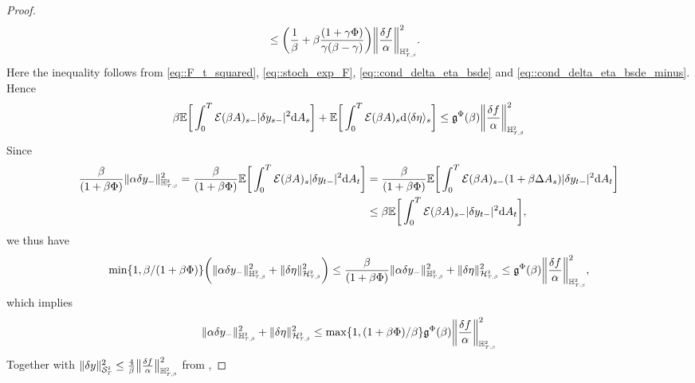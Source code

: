 \documentclass[10pt]{article} %
\newcommand\cE{\mathcal E}
\newcommand\cH{\mathcal H}
\newcommand\cS{\mathcal S}
\newcommand{\smalltext}[1]{\text{\fontsize{4}{4}\selectfont$#1$}}
\newcommand\fg{\mathfrak g}
\def \E{\mathbb{E}}
\def \H{\mathbb{H}}
\newcommand{\1}{\mathbf{1}}
\def\d{\mathrm{d}}
\begin{document}
\begin{proof}
\begin{align*}
		&\leq \bigg(\frac{1}{\beta} + \beta\frac{(1+\gamma\Phi)}{\gamma(\beta-\gamma)}\bigg) \bigg\|\frac{\delta f}{\alpha}\bigg\|^2_{\H^\smalltext{2}_{\smalltext{T}\smalltext{,}\smalltext{\beta}}}.
	\end{align*}
	Here the inequality follows from \eqref{eq::F_t_squared}, \eqref{eq::stoch_exp_F}, \eqref{eq::cond_delta_eta_bsde} and \eqref{eq::cond_delta_eta_bsde_minus}. Hence
	\begin{equation*}
		\beta \E\bigg[\int_0^T \cE(\beta A)_{s-}|\delta y_{s-}|^2\d A_s\bigg] + \E\bigg[\int_0^T \cE(\beta A)_s \d \langle\delta\eta\rangle_s\bigg] \leq \fg^\Phi(\beta) \bigg\|\frac{\delta f}{\alpha}\bigg\|^2_{\H^\smalltext{2}_{\smalltext{T}\smalltext{,}\smalltext{\beta}}}
	\end{equation*}
	 Since
	\begin{align*}
		\frac{\beta}{(1+\beta\Phi)}\|\alpha\delta y_{-}\|^2_{\H^\smalltext{2}_{\smalltext{T}\smalltext{,}\smalltext{\beta}}} = \frac{\beta}{(1+\beta\Phi)} \E\bigg[\int_0^T \cE(\beta A)_{s}|\delta y_{t-}|^2\d A_t\bigg] 
		&= \frac{\beta}{(1+\beta\Phi)} \E\bigg[\int_0^T \cE(\beta A)_{s-}(1+\beta\Delta A_s)|\delta y_{t-}|^2\d A_t\bigg] \\
		&\leq \beta \E\bigg[\int_0^T \cE(\beta A)_{s-}|\delta y_{t-}|^2\d A_t\bigg],
	\end{align*}
	we thus have
	\begin{equation*}
		\min\{1,\beta/(1+\beta\Phi)\} \bigg(\|\alpha\delta y_{-}\|^2_{\H^\smalltext{2}_{\smalltext{T}\smalltext{,}\smalltext{\beta}}} + \|\delta\eta\|^2_{\cH^\smalltext{2}_{\smalltext{T}\smalltext{,}\smalltext{\beta}}}\bigg) 
		\leq \frac{\beta}{(1+\beta\Phi)}\|\alpha\delta y_{-}\|^2_{\H^\smalltext{2}_{\smalltext{T}\smalltext{,}\smalltext{\beta}}} + \|\delta\eta\|^2_{\cH^\smalltext{2}_{\smalltext{T}\smalltext{,}\smalltext{\beta}}} 
		\leq \fg^\Phi(\beta) \bigg\|\frac{\delta f}{\alpha}\bigg\|^2_{\H^\smalltext{2}_{\smalltext{T}\smalltext{,}\smalltext{\beta}}},
	\end{equation*}
	which implies
	\begin{equation*}
		\|\alpha\delta y_{-}\|^2_{\H^\smalltext{2}_{\smalltext{T}\smalltext{,}\smalltext{\beta}}} + \|\delta\eta\|^2_{\cH^\smalltext{2}_{\smalltext{T}\smalltext{,}\smalltext{\beta}}}  
		\leq \max\{1,(1+\beta\Phi)/\beta\}\fg^\Phi(\beta) \bigg\|\frac{\delta f}{\alpha}\bigg\|^2_{\H^\smalltext{2}_{\smalltext{T}\smalltext{,}\smalltext{\beta}}}
	\end{equation*}
	Together with $\|\delta y\|^2_{\cS^\smalltext{2}_\smalltext{T}} \leq \frac{4}{\beta} \big\|\frac{\delta f}{\alpha}\big\|^2_{\H^\smalltext{2}_{\smalltext{T}\smalltext{,}\smalltext{\beta}}}$ from , 

\end{proof}
\end{document}
